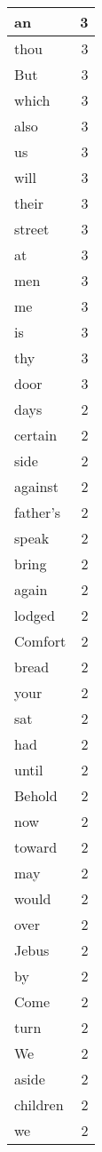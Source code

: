 \begin{center}
\begin{longtable}{l|r}
an & 3 \\ \hline
thou & 3 \\ \hline
But & 3 \\ \hline
which & 3 \\ \hline
also & 3 \\ \hline
us & 3 \\ \hline
will & 3 \\ \hline
their & 3 \\ \hline
street & 3 \\ \hline
at & 3 \\ \hline
men & 3 \\ \hline
me & 3 \\ \hline
is & 3 \\ \hline
thy & 3 \\ \hline
door & 3 \\ \hline
days & 2 \\ \hline
certain & 2 \\ \hline
side & 2 \\ \hline
against & 2 \\ \hline
father's & 2 \\ \hline
speak & 2 \\ \hline
bring & 2 \\ \hline
again & 2 \\ \hline
lodged & 2 \\ \hline
Comfort & 2 \\ \hline
bread & 2 \\ \hline
your & 2 \\ \hline
sat & 2 \\ \hline
had & 2 \\ \hline
until & 2 \\ \hline
Behold & 2 \\ \hline
now & 2 \\ \hline
toward & 2 \\ \hline
may & 2 \\ \hline
would & 2 \\ \hline
over & 2 \\ \hline
Jebus & 2 \\ \hline
by & 2 \\ \hline
Come & 2 \\ \hline
turn & 2 \\ \hline
We & 2 \\ \hline
aside & 2 \\ \hline
children & 2 \\ \hline
we & 2 \\ \hline

\end{longtable}
\end{center}

